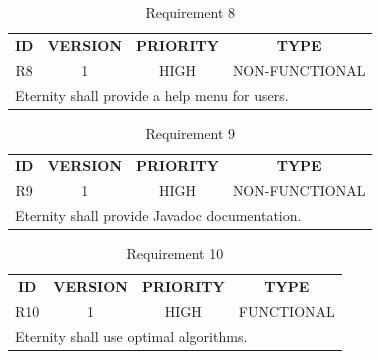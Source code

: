 \documentclass[11pt,a4paper]{report}
\theoremstyle{definition}
\theoremstyle{remark}
\begin{document}
        \begin{table}[ht]
        \centering
            \begin{tabular}{cccc} %
                \textbf{ID} & \textbf{VERSION} & \textbf{PRIORITY} & \textbf{TYPE}\\
                        R8  &           1      &           HIGH    &      NON-FUNCTIONAL\\
                \hline
                \multicolumn{4}{l}{Eternity shall provide a help menu for users.}
            \end{tabular}
            \caption{Requirement 8}
            \label{tab:table-requirements-8}
        \end{table}
        \vspace{3em}
        
        \begin{table}[ht]
        \centering
            \begin{tabular}{cccc} %
                \textbf{ID} & \textbf{VERSION} & \textbf{PRIORITY} & \textbf{TYPE}\\
                        R9  &           1      &           HIGH    &      NON-FUNCTIONAL\\
                \hline
                \multicolumn{4}{l}{Eternity shall provide Javadoc documentation.}
            \end{tabular}
            \caption{Requirement 9}
            \label{tab:table-requirements-9}
        \end{table}
        \vspace{3em}
        
        \begin{table}[ht]
        \centering
            \begin{tabular}{cccc} %
                \textbf{ID} & \textbf{VERSION} & \textbf{PRIORITY} & \textbf{TYPE}\\
                        R10  &           1      &           HIGH    &      FUNCTIONAL\\
                \hline
                \multicolumn{4}{l}{Eternity shall use optimal algorithms.}
            \end{tabular}
            \caption{Requirement 10}
            \label{tab:table-requirements-10}
        \end{table}
        \vspace{3em}
        
\end{document}
